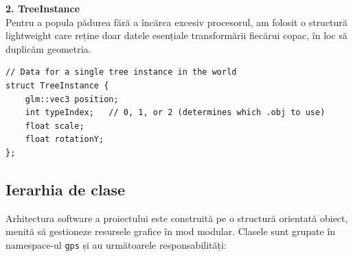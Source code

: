 \documentclass[11pt,a4paper]{article}
\begin{document}
\textbf{2. TreeInstance} \\
Pentru a popula pădurea fără a încărca excesiv procesorul, am folosit o structură lightweight care reține doar datele esențiale transformării fiecărui copac, în loc să duplicăm geometria.

\begin{verbatim}
// Data for a single tree instance in the world
struct TreeInstance {
    glm::vec3 position;
    int typeIndex;   // 0, 1, or 2 (determines which .obj to use)
    float scale;
    float rotationY; 
};
\end{verbatim}
\subsection{Ierarhia de clase}

Arhitectura software a proiectului este construită pe o structură orientată obiect, menită să gestioneze resursele grafice în mod modular. Clasele sunt grupate în namespace-ul \texttt{gps} și au următoarele responsabilități:
\end{document}
